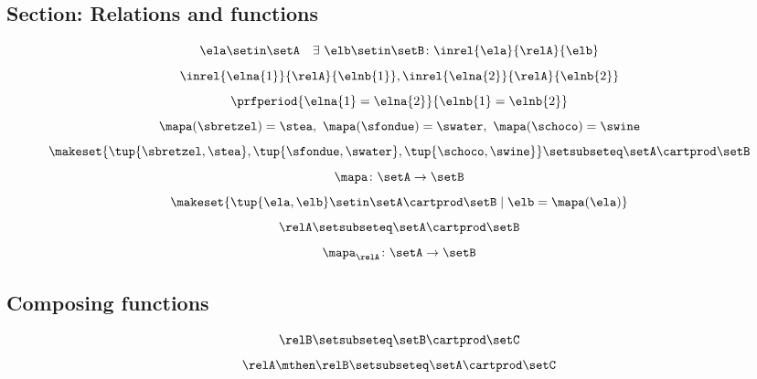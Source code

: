 \begin{forslides}
\subsection{Section: Relations and functions}

 \begin{equation}\label{eq:slides_session2_99}
\ela \setin \setA \quad \exists \ \elb \setin \setB\colon  \inrel{\ela}{\relA}{\elb}
\end{equation}
\begin{equation}\label{eq:slides_session2_100}
\inrel{\elna{1}}{\relA}{\elnb{1}}, \inrel{\elna{2}}{\relA}{\elnb{2}}
\end{equation}
 \begin{equation}\label{eq:slides_session2_101}
\prfperiod{\elna{1} = \elna{2}}{\elnb{1} = \elnb{2}}
\end{equation}
\begin{equation}\label{eq:slides_session2_102}
\mapa (\sbretzel) = \stea, \ \mapa (\sfondue) = \swater, \ \mapa(\schoco) = \swine
\end{equation}
 \begin{equation}\label{eq:slides_session2_103}
\makeset{ \tup{\sbretzel, \stea}, \tup{\sfondue, \swater}, \tup{\schoco, \swine} } \setsubseteq \setA \cartprod \setB
\end{equation}
\begin{equation}\label{eq:slides_session2_104}
\mapa \colon \setA \to \setB
\end{equation}
 \begin{equation}\label{eq:slides_session2_105}
 \makeset{ \tup{\ela,\elb} \setin \setA \cartprod \setB \mid \elb= \mapa(\ela) }
\end{equation}
\begin{equation}\label{eq:slides_session2_106}
\relA \setsubseteq \setA \cartprod \setB
\end{equation}
 \begin{equation}\label{eq:slides_session2_107}
\mapa_\relA \colon \setA \to \setB
\end{equation}

\subsection{Composing functions}

\begin{equation}\label{eq:slides_session2_108}
\relB \setsubseteq \setB \cartprod \setC
\end{equation}
 \begin{equation}\label{eq:slides_session2_109}
\relA \mthen \relB \setsubseteq \setA \cartprod \setC
\end{equation}


\end{forslides}
